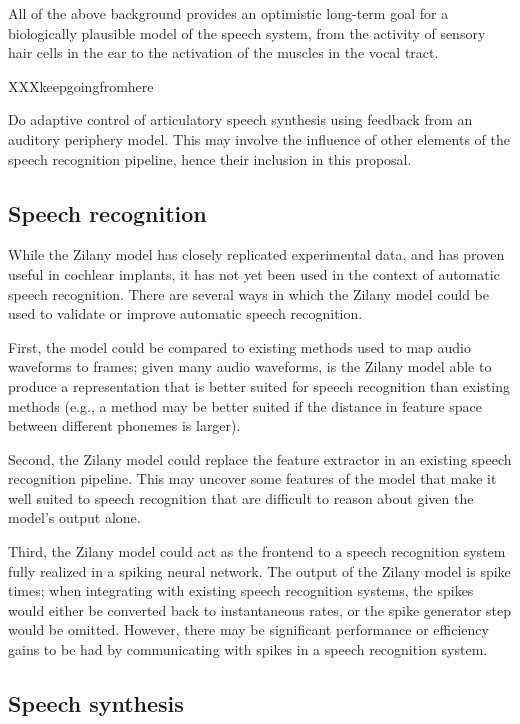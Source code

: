 \documentclass{article}
\begin{document}
All of the above background
provides an optimistic long-term
goal for a biologically plausible
model of the speech system,
from the activity of sensory
hair cells in the ear
to the activation of
the muscles in the vocal tract.

XXXkeepgoingfromhere

Do adaptive control of
articulatory speech synthesis
using feedback from
an auditory periphery model.
This may involve the influence
of other elements
of the speech recognition pipeline,
hence their inclusion in this proposal.

\subsection{Speech recognition}

While the Zilany model
has closely replicated experimental data,
and has proven useful in cochlear implants,
it has not yet been used in the context
of automatic speech recognition.
There are several ways in which
the Zilany model could be used
to validate or improve automatic speech recognition.

First, the model could be compared
to existing methods used to map
audio waveforms to frames;
given many audio waveforms,
is the Zilany model able to
produce a representation that
is better suited for speech recognition
than existing methods
(e.g., a method may be better suited
if the distance in feature space
between different phonemes is larger).

Second, the Zilany model could
replace the feature extractor
in an existing speech recognition pipeline.
This may uncover some features
of the model that make it well suited
to speech recognition that
are difficult to reason about
given the model's output alone.

Third, the Zilany model could
act as the frontend to a
speech recognition system
fully realized in a spiking neural network.
The output of the Zilany model
is spike times;
when integrating with existing
speech recognition systems,
the spikes would either be
converted back to instantaneous rates,
or the spike generator step
would be omitted.
However, there may be significant performance
or efficiency gains to be had
by communicating with spikes
in a speech recognition system.

\subsection{Speech synthesis}
\end{document}
